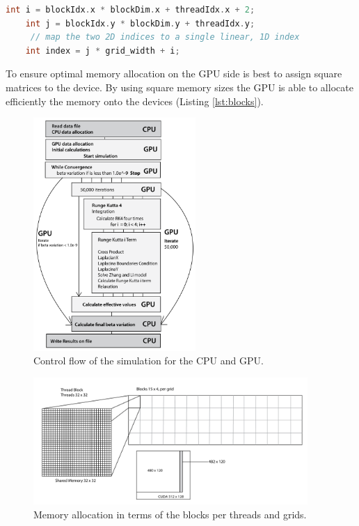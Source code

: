 \begin{lstlisting}[language=C++, label={lst:flatten}, caption={Kernel Flatten from a 2 value index to a single value index.}]	
    int i = blockIdx.x * blockDim.x + threadIdx.x + 2;
    int j = blockIdx.y * blockDim.y + threadIdx.y;
     // map the two 2D indices to a single linear, 1D index
    int index = j * grid_width + i; 
\end{lstlisting}


To ensure optimal memory allocation on the GPU side is best to assign square matrices to the device. By using square memory sizes the GPU is able to allocate efficiently the memory onto the devices (Listing \ref{lst:blocks}).

\begin{figure}[htbp]
	\centering
		\includegraphics[width=0.55\textwidth]{Figures/flow.png}
		\smallskip
	\caption[Control flow]{Control flow of the simulation for the CPU and GPU.}
	\label{fig:flow}
\end{figure}


\begin{figure}[htbp]
	\centering
		\includegraphics[width=0.93\textwidth]{Figures/block.png}
		\smallskip
	\caption[Grid layout]{Memory allocation in terms of the blocks per threads and grids.}
	\label{fig:block}
\end{figure}


